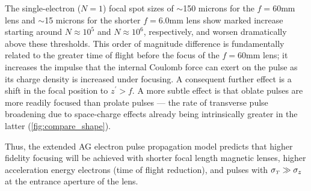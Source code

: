 The single-electron ($ N = 1 $) focal spot sizes of $\sim$150 microns for the $ f = 60 \text{mm} $ lens and $\sim$15 microns for the shorter $ f = 6.0 \text{mm} $ lens show marked increase starting around $ N \approx 10^{ 5 } $ and $ N \approx 10^{ 6 }$, respectively, and worsen dramatically above these thresholds.
This order of magnitude difference is fundamentally related to the greater time of flight before the focus of the $ f = 60\text{mm} $ lens; it increases the impulse that the internal Coulomb force can exert on the pulse as its charge density is increased under focusing.
A consequent further effect is a shift in the focal position to $ z^{\prime} > f $.
A more subtle effect is that oblate pulses are more readily focused than prolate pulses --- the rate of transverse pulse broadening due to space-charge effects already being intrinsically greater in the latter (\ref{fig:compare_shape}).


Thus, the extended AG electron pulse propagation model predicts that higher fidelity focusing will be achieved with shorter focal length magnetic lenses, higher acceleration energy electrons (time of flight reduction), and pulses with $ \sigma_{ {\scriptscriptstyle T} } \gg \sigma_{ z } $ at the entrance aperture of the lens.


